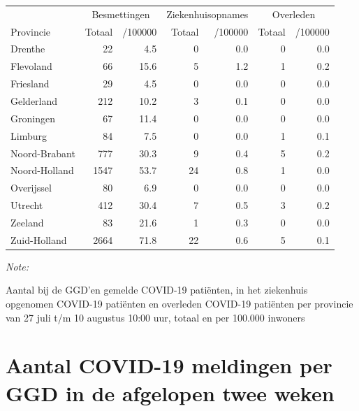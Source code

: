 \documentclass[
  english,
  man,floatsintext]{apa6}
\begin{document}
\begin{table}[H]
\centering
\begin{threeparttable}
\begin{tabular}{lrrrrrr}
\toprule
\multicolumn{1}{c}{ } & \multicolumn{2}{c}{Besmettingen} & \multicolumn{2}{c}{Ziekenhuisopnames} & \multicolumn{2}{c}{Overleden} \\
\cmidrule(l{3pt}r{3pt}){2-3} \cmidrule(l{3pt}r{3pt}){4-5} \cmidrule(l{3pt}r{3pt}){6-7}
Provincie & Totaal & /100000 & Totaal & /100000 & Totaal & /100000\\
\midrule
Drenthe & 22 & 4.5 & 0 & 0.0 & 0 & 0.0\\
Flevoland & 66 & 15.6 & 5 & 1.2 & 1 & 0.2\\
Friesland & 29 & 4.5 & 0 & 0.0 & 0 & 0.0\\
Gelderland & 212 & 10.2 & 3 & 0.1 & 0 & 0.0\\
Groningen & 67 & 11.4 & 0 & 0.0 & 0 & 0.0\\
Limburg & 84 & 7.5 & 0 & 0.0 & 1 & 0.1\\
Noord-Brabant & 777 & 30.3 & 9 & 0.4 & 5 & 0.2\\
Noord-Holland & 1547 & 53.7 & 24 & 0.8 & 1 & 0.0\\
Overijssel & 80 & 6.9 & 0 & 0.0 & 0 & 0.0\\
Utrecht & 412 & 30.4 & 7 & 0.5 & 3 & 0.2\\
Zeeland & 83 & 21.6 & 1 & 0.3 & 0 & 0.0\\
Zuid-Holland & 2664 & 71.8 & 22 & 0.6 & 5 & 0.1\\
\bottomrule
\end{tabular}
\begin{tablenotes}
\item \textit{Note: } 
\item Aantal bij de GGD’en gemelde COVID-19 patiënten, in het ziekenhuis opgenomen COVID-19 patiënten en overleden COVID-19 patiënten per provincie van 27 juli t/m 10 augustus 10:00 uur, totaal en per 100.000 inwoners
\end{tablenotes}
\end{threeparttable}
\end{table}

\newpage

\hypertarget{aantal-covid-19-meldingen-per-ggd-in-de-afgelopen-twee-weken}{%
\section{Aantal COVID-19 meldingen per GGD in de afgelopen twee weken}\label{aantal-covid-19-meldingen-per-ggd-in-de-afgelopen-twee-weken}}
\end{document}
